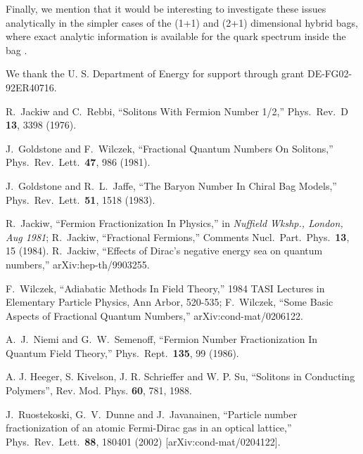 \documentclass[a4paper,prd,showpacs,showkeys]{revtex4}
\begin{document}
{{Finally, we mention that it would be interesting to investigate these issues analytically in the simpler cases of the (1+1) and (2+1) dimensional hybrid bags, where exact analytic information is available for the quark spectrum inside the bag \cite{zahed,wipf}.


\begin{acknowledgments}
We thank the U. S. Department of Energy for support through grant
DE-FG02-92ER40716.
\end{acknowledgments}




    


\begin{thebibliography}{99}

 R.~Jackiw and C.~Rebbi,
``Solitons With Fermion Number 1/2,''
Phys.\ Rev.\ D {\bf 13}, 3398 (1976).

 J.~Goldstone and F.~Wilczek,
``Fractional Quantum Numbers On Solitons,''
Phys.\ Rev.\ Lett.\  {\bf 47}, 986 (1981).

 J.~Goldstone and R.~L.~Jaffe,
``The Baryon Number In Chiral Bag Models,''
Phys.\ Rev.\ Lett.\  {\bf 51}, 1518 (1983).

 R.~Jackiw,
``Fermion Fractionization In Physics,''
in {\it Nuffield Wkshp., London, Aug 1981};  R.~Jackiw,
``Fractional Fermions,''
Comments Nucl.\ Part.\ Phys.\  {\bf 13}, 15 (1984).
R.~Jackiw,
``Effects of Dirac's negative energy sea on quantum numbers,''
arXiv:hep-th/9903255.

 F.~Wilczek,
``Adiabatic Methods In Field Theory,'' 1984 TASI Lectures in Elementary Particle Physics, Ann Arbor, 520-535;  F.~Wilczek,
``Some Basic Aspects of Fractional Quantum Numbers,''
arXiv:cond-mat/0206122.

 A.~J.~Niemi and G.~W.~Semenoff,
``Fermion Number Fractionization In Quantum Field Theory,''
Phys.\ Rept.\  {\bf 135}, 99 (1986).

 A. J. Heeger, S. Kivelson, J. R. Schrieffer and W. P. Su, ``Solitons in Conducting Polymers'', Rev. Mod. Phys. {\bf 60}, 781, 1988.

 J.~Ruostekoski, G.~V.~Dunne and J.~Javanainen,
``Particle number fractionization of an atomic Fermi-Dirac gas in an optical lattice,''
Phys.\ Rev.\ Lett.\  {\bf 88}, 180401 (2002)
[arXiv:cond-mat/0204122].


\end{thebibliography}}}
\end{document}
